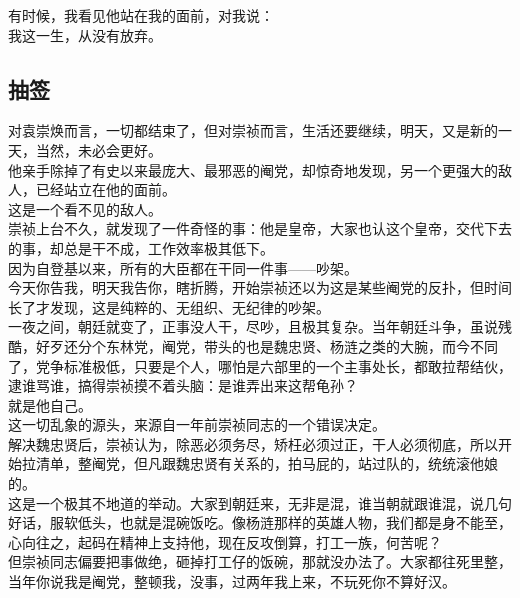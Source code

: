 \begin{multicols}{\theparacolNo}
有时候，我看见他站在我的面前，对我说：\\

我这一生，从没有放弃。\\

\subsection{抽签}
对袁崇焕而言，一切都结束了，但对崇祯而言，生活还要继续，明天，又是新的一天，当然，未必会更好。\\

他亲手除掉了有史以来最庞大、最邪恶的阉党，却惊奇地发现，另一个更强大的敌人，已经站立在他的面前。\\

这是一个看不见的敌人。\\

崇祯上台不久，就发现了一件奇怪的事：他是皇帝，大家也认这个皇帝，交代下去的事，却总是干不成，工作效率极其低下。\\

因为自登基以来，所有的大臣都在干同一件事——吵架。\\

今天你告我，明天我告你，瞎折腾，开始崇祯还以为这是某些阉党的反扑，但时间长了才发现，这是纯粹的、无组织、无纪律的吵架。\\

一夜之间，朝廷就变了，正事没人干，尽吵，且极其复杂。当年朝廷斗争，虽说残酷，好歹还分个东林党，阉党，带头的也是魏忠贤、杨涟之类的大腕，而今不同了，党争标准极低，只要是个人，哪怕是六部里的一个主事处长，都敢拉帮结伙，逮谁骂谁，搞得崇祯摸不着头脑：是谁弄出来这帮龟孙？\\

就是他自己。\\

这一切乱象的源头，来源自一年前崇祯同志的一个错误决定。\\

解决魏忠贤后，崇祯认为，除恶必须务尽，矫枉必须过正，干人必须彻底，所以开始拉清单，整阉党，但凡跟魏忠贤有关系的，拍马屁的，站过队的，统统滚他娘的。\\

这是一个极其不地道的举动。大家到朝廷来，无非是混，谁当朝就跟谁混，说几句好话，服软低头，也就是混碗饭吃。像杨涟那样的英雄人物，我们都是身不能至，心向往之，起码在精神上支持他，现在反攻倒算，打工一族，何苦呢？\\

但崇祯同志偏要把事做绝，砸掉打工仔的饭碗，那就没办法了。大家都往死里整，当年你说我是阉党，整顿我，没事，过两年我上来，不玩死你不算好汉。\\


\end{multicols}
